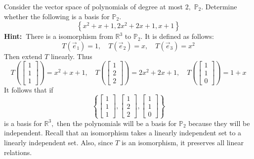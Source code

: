 \documentclass{ximera}
\begin{document}
\begin{problem}\label{prb:10.28} Consider the vector space of polynomials of degree at most $2,$ $%
\mathbb{P}_{2}$. Determine whether the following is a basis for $\mathbb{P}%
_{2}$.
\begin{equation*}
\left\{ x^{2}+x+1,2x^{2}+2x+1,x+1\right\}
\end{equation*}
\textbf{Hint:\ }There is a isomorphism from $\mathbb{R}^{3}$ to $\mathbb{P}
_{2}$. It is defined as follows:\
\begin{equation*}
T(\vec{e}_{1})=1,\quad T(\vec{e}_{2})=x,\quad T(\vec{e}_{3})=x^{2}
\end{equation*}
Then extend $T$ linearly. Thus
\begin{equation*}
T\left(\left[
\begin{array}{c}
1 \\
1 \\
1
\end{array}
\right]\right) =x^{2}+x+1,\quad T\left(\left[
\begin{array}{c}
1 \\
2 \\
2
\end{array}
\right]\right) =2x^{2}+2x+1,\quad T\left(\left[
\begin{array}{c}
1 \\
1 \\
0
\end{array}
\right]\right) =1+x
\end{equation*}
It follows that if
\begin{equation*}
\left\{ \left[
\begin{array}{c}
1 \\
1 \\
1
\end{array}
\right] ,\left[
\begin{array}{c}
1 \\
2 \\
2
\end{array}
\right] ,\left[
\begin{array}{c}
1 \\
1 \\
0
\end{array}
\right] \right\}
\end{equation*}
is a basis for $\mathbb{R}^{3},$ then the polynomials will be a basis for $
\mathbb{P}_{2}$ because they will be independent. Recall that an isomorphism
takes a linearly independent set to a linearly independent set. Also, since $
T$ is an isomorphism, it preserves all linear relations.
\end{problem}
\end{document}
